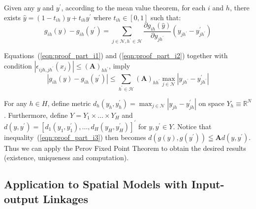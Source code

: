 Given any $y$ and $y^{\prime}$, according to the mean value theorem, for each $i$ and $h$, 
there exists $\hat{y}=\left(1-t_{i h}\right) y+t_{i h} y^{\prime}$ where $t_{i h} \in[0,1]$ such that:
\begin{equation}
    \label{eqn:proof_part_i2}
    g_{i h}(y)-g_{i h}\left(y^{\prime}\right)=\sum_{j \in \mathcal{N}, h^{\prime} \in \mathcal{H}} \frac{\partial g_{i h}(\hat{y})}{\partial y_{j h^{\prime}}}\left(y_{j h^{\prime}}-y_{j h^{\prime}}^{\prime}\right)
\end{equation}


Equations~(\ref{eqn:proof_part_i1}) and (\ref{eqn:proof_part_i2}) together with 
condition $\left|\epsilon_{i j h, j h^{\prime}}\left(x_j\right)\right| \leq(\mathbf{A})_{h h^{\prime}}$, imply
\begin{equation}
    \label{eqn:proof_part_i3}
\left|g_{i h}(y)-g_{i h}\left(y^{\prime}\right)\right| \leq \sum_{h^{\prime} \in \mathcal{H}}(\mathbf{A})_{h h^{\prime}} \max _{j \in \mathcal{N}}\left|y_{j h^{\prime}}-y_{j h^{\prime}}^{\prime}\right|
\end{equation}

For any $h \in H$, define metric $d_h\left(y_h, y_h^{\prime}\right)=\max _{j \in \mathcal{N}}\left|y_{j h}-y_{j h}^{\prime}\right|$ on space $Y_h \equiv \mathbb{R}^N$. 
Furthermore, define $Y=Y_1 \times \ldots \times Y_H$ and $d\left(y, y^{\prime}\right)=\left[d_1\left(y_1, y_1^{\prime}\right), \ldots, d_H\left(y_H, y_H^{\prime}\right)\right]^{\prime}$ for $y, y^{\prime} \in Y$.
Notice that inequality~(\ref{eqn:proof_part_i3}) then becomes $d\left(g(y), g\left(y^{\prime}\right)\right) \leqq \mathbf{A} d\left(y, y^{\prime}\right)$. 
Thus we can apply the Perov Fixed Point Theorem to obtain the desired results 
(existence, uniqueness and computation).

\subsection{Application to Spatial Models with Input-output Linkages}